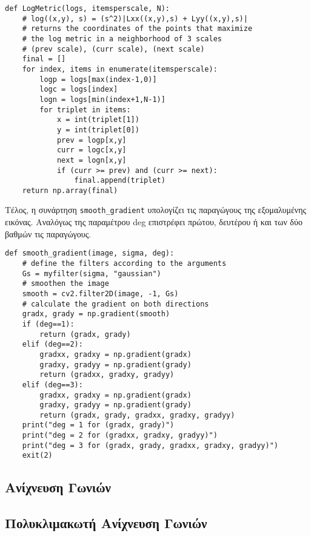 \documentclass{article}
\newcommand{\eng}[1]{\foreignlanguage{english}{#1}}
\begin{document}
\begin{lstlisting}[breaklines=true, showstringspaces=false]
def LogMetric(logs, itemsperscale, N):
    # log((x,y), s) = (s^2)|Lxx((x,y),s) + Lyy((x,y),s)|
    # returns the coordinates of the points that maximize
    # the log metric in a neighborhood of 3 scales
    # (prev scale), (curr scale), (next scale)
    final = []
    for index, items in enumerate(itemsperscale):
        logp = logs[max(index-1,0)]
        logc = logs[index]
        logn = logs[min(index+1,N-1)] 
        for triplet in items:
            x = int(triplet[1])
            y = int(triplet[0])
            prev = logp[x,y]
            curr = logc[x,y]
            next = logn[x,y]
            if (curr >= prev) and (curr >= next):
                final.append(triplet)
    return np.array(final)
\end{lstlisting}

Τέλος, η συνάρτηση \eng{\texttt{smooth\_gradient}} υπολογίζει τις παραγώγους της εξομαλυμένης εικόνας. Αναλόγως της παραμέτρου \eng{deg} επιστρέφει πρώτου, δευτέρου ή και των δύο βαθμών τις παραγώγους.

\begin{lstlisting}[breaklines=true, showstringspaces=false]
def smooth_gradient(image, sigma, deg):
    # define the filters according to the arguments
    Gs = myfilter(sigma, "gaussian")
    # smoothen the image
    smooth = cv2.filter2D(image, -1, Gs)
    # calculate the gradient on both directions 
    gradx, grady = np.gradient(smooth)
    if (deg==1):
        return (gradx, grady)
    elif (deg==2):
        gradxx, gradxy = np.gradient(gradx)
        gradxy, gradyy = np.gradient(grady)
        return (gradxx, gradxy, gradyy)
    elif (deg==3):
        gradxx, gradxy = np.gradient(gradx)
        gradxy, gradyy = np.gradient(grady)
        return (gradx, grady, gradxx, gradxy, gradyy)
    print("deg = 1 for (gradx, grady)")
    print("deg = 2 for (gradxx, gradxy, gradyy)")
    print("deg = 3 for (gradx, grady, gradxx, gradxy, gradyy)")
    exit(2)
\end{lstlisting}

\subsection{Ανίχνευση Γωνιών}


\subsection{Πολυκλιμακωτή Ανίχνευση Γωνιών}
\end{document}
